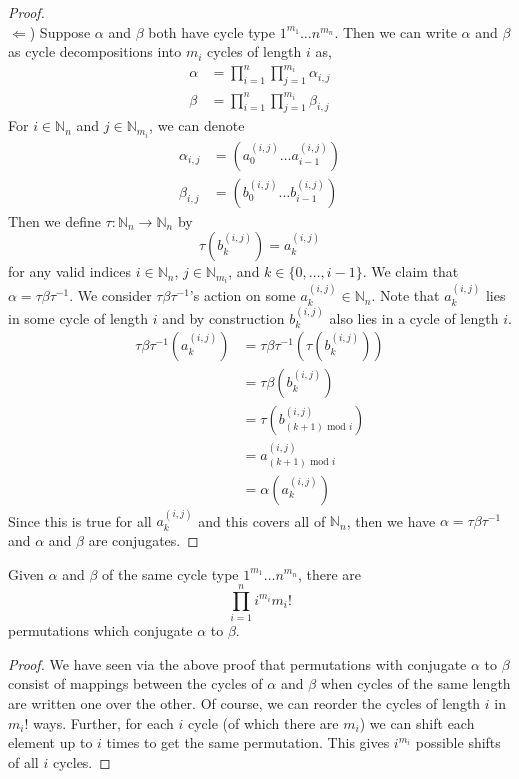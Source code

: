 \begin{proof}
\text{}\\$\Leftarrow$) Suppose $\alpha$ and $\beta$ both have cycle
type $1^{m_1}\dots n^{m_n}$. Then we can write $\alpha$ and $\beta$
as cycle decompositions into $m_i$ cycles of length $i$ as,
\begin{align*}
\alpha & = \prod_{i=1}^{n}\prod_{j=1}^{m_i}\alpha_{i,j}\\
\beta  & = \prod_{i=1}^{n}\prod_{j=1}^{m_i}\beta_{i,j}
\end{align*}
For $i\in\mathbb{N}_n$ and $j\in\mathbb{N}_{m_i}$, we can denote
\begin{align*}
\alpha_{i,j} & = (a^{(i,j)}_0\dots a^{(i,j)}_{i-1})\\
\beta_{i,j}  & = (b^{(i,j)}_0\dots b^{(i,j)}_{i-1})
\end{align*}
Then we define $\tau:\mathbb{N}_n\to\mathbb{N}_n$ by
\[
\tau(b^{(i,j)}_k) = a^{(i,j)}_k
\]
for any valid indices $i\in\mathbb{N}_n$, $j\in\mathbb{N}_{m_i}$, and
$k\in\{0,\dots, i-1\}$.
We claim that $\alpha = \tau\beta\tau^{-1}$. We consider
$\tau\beta\tau^{-1}$'s action on some $a^{(i,j)}_k\in\mathbb{N}_n$.
Note that $a^{(i,j)}_k$ lies in some cycle of length $i$ and by
construction $b^{(i,j)}_k$ also lies in a cycle of length $i$.
\begin{align*}
\tau\beta\tau^{-1}(a^{(i,j)}_k) & =
\tau\beta\tau^{-1}(\tau(b^{(i,j)}_k))        \\
& = \tau\beta(b^{(i,j)}_k)                       \\
& = \tau(b^{(i,j)}_{(k+1)\text{ mod }i}) \\
& = a^{(i,j)}_{(k+1)\text{ mod }i}      \\
& = \alpha(a^{(i,j)}_k)
\end{align*}
Since this is true for all $a^{(i,j)}_k$ and this covers all of
$\mathbb{N}_n$, then we have $\alpha = \tau\beta\tau^{-1}$ and
$\alpha$ and $\beta$ are conjugates.
\end{proof}
\begin{corr}\label{possible_conjugates}
Given $\alpha$ and $\beta$ of the same cycle type
$1^{m_1}\dots n^{m_n}$, there are
\[
\prod_{i=1}^{n}i^{m_i}m_i!
\]
permutations which conjugate $\alpha$ to $\beta$.
\end{corr}
\begin{proof}
We have seen via the above proof that permutations with conjugate
$\alpha$ to $\beta$ consist of mappings between the cycles of $\alpha$
and $\beta$ when cycles of the same length are written one over the
other. Of course, we can reorder the cycles of length $i$ in
$m_i!$ ways. Further, for each $i$ cycle (of which there are
$m_i$) we can shift each element up to $i$ times to get the
same permutation. This gives $i^{m_i}$ possible shifts of all $i$ cycles.
\end{proof}
